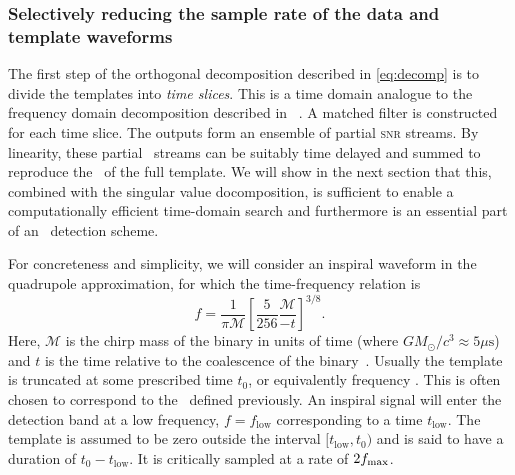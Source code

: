 \subsubsection{Selectively reducing the sample rate of the data and template waveforms}

The first step of the orthogonal decomposition described in \eqref{eq:decomp}
is to divide the templates into \emph{time slices}.  This is a time domain
analogue to the frequency domain decomposition described in ~\cite{Marion2004,
Buskulic2010, beauville2006, beauville2008}.  A matched filter is constructed
for each time slice.  The outputs form an ensemble of partial \textsc{snr}
streams.  By linearity, these partial \SNR\ streams can be suitably time
delayed and summed to reproduce the \SNR\ of the full template.  We will show
in the next section that this, combined with the singular value docomposition,
is sufficient to enable a computationally efficient time-domain search and
furthermore is an essential part of an \earlywarning\ detection scheme.

For concreteness and simplicity, we will consider an inspiral waveform in the
quadrupole approximation, for which the time-frequency relation is
%
\begin{equation} \label{eq:fgw}
%
f = \frac{1}{\mathcal{\pi M}} \left[ \frac{5}{256}\frac{\mathcal{M}}{-t}
\right]^{3/8}.
%
\end{equation}
%
Here, $\mathcal{M}$ is the chirp mass of the binary in units of time (where $G
M_\odot / c^3 \approx 5 \mu\mathrm{s}$) and $t$ is the time relative to the
coalescence of the binary~\cite{findchirppaper, kidder1992}.  Usually the
template is truncated at some prescribed time $t_0$, or equivalently frequency \fmax.
This is often chosen to correspond to the \ISCO\ defined previously. An inspiral signal
will enter the detection band at a low frequency, $f = f_\mathrm{low}$
corresponding to a time $t_\mathrm{low}$.  The template is assumed to be zero
outside the interval $[t_\mathrm{low}, t_\mathrm{0})$ and is said to have  a
duration of $t_\mathrm{0} - t_\mathrm{low}$. It is critically sampled at a
rate of $2 f_{\mathrm{max}}$.  


